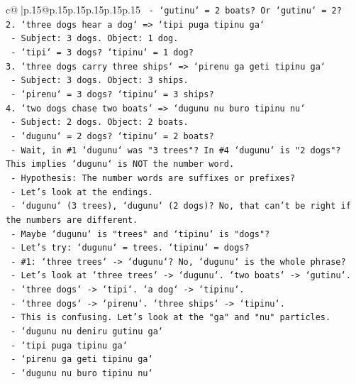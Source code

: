 \documentclass{article}
\begin{document}
{\begin{supertabular}{c@{$\;$}|p{.15\linewidth}@{}p{.15\linewidth}p{.15\linewidth}p{.15\linewidth}p{.15\linewidth}p{.15\linewidth}}
{{{\texttt{   {-} `gutinu` = 2 boats? Or `gutinu` = 2?} \\
\texttt{2. `three dogs hear a dog` => `tipi puga tipinu ga`} \\
\texttt{   {-} Subject: 3 dogs. Object: 1 dog.} \\
\texttt{   {-} `tipi` = 3 dogs? `tipinu` = 1 dog?} \\
\texttt{3. `three dogs carry three ships` => `pirenu ga geti tipinu ga`} \\
\texttt{   {-} Subject: 3 dogs. Object: 3 ships.} \\
\texttt{   {-} `pirenu` = 3 dogs? `tipinu` = 3 ships?} \\
\texttt{4. `two dogs chase two boats` => `dugunu nu buro tipinu nu`} \\
\texttt{   {-} Subject: 2 dogs. Object: 2 boats.} \\
\texttt{   {-} `dugunu` = 2 dogs? `tipinu` = 2 boats?} \\
\texttt{   {-} Wait, in \#1 `dugunu` was "3 trees"? In \#4 `dugunu` is "2 dogs"? This implies `dugunu` is NOT the number word.} \\
\texttt{   {-} Hypothesis: The number words are suffixes or prefixes?} \\
\texttt{   {-} Let's look at the endings.} \\
\texttt{   {-} `dugunu` (3 trees), `dugunu` (2 dogs)? No, that can't be right if the numbers are different.} \\
\texttt{   {-} Maybe `dugunu` is "trees" and `tipinu` is "dogs"?} \\
\texttt{   {-} Let's try: `dugunu` = trees. `tipinu` = dogs?} \\
\texttt{   {-} \#1: `three trees` {-}> `dugunu`? No, `dugunu` is the whole phrase?} \\
\texttt{   {-} Let's look at `three trees` {-}> `dugunu`. `two boats` {-}> `gutinu`.} \\
\texttt{   {-} `three dogs` {-}> `tipi`. `a dog` {-}> `tipinu`.} \\
\texttt{   {-} `three dogs` {-}> `pirenu`. `three ships` {-}> `tipinu`.} \\
\texttt{   {-} This is confusing. Let's look at the "ga" and "nu" particles.} \\
\texttt{   {-} `dugunu nu deniru gutinu ga`} \\
\texttt{   {-} `tipi puga tipinu ga`} \\
\texttt{   {-} `pirenu ga geti tipinu ga`} \\
\texttt{   {-} `dugunu nu buro tipinu nu`} \\
}}}
\end{supertabular}}
\end{document}
